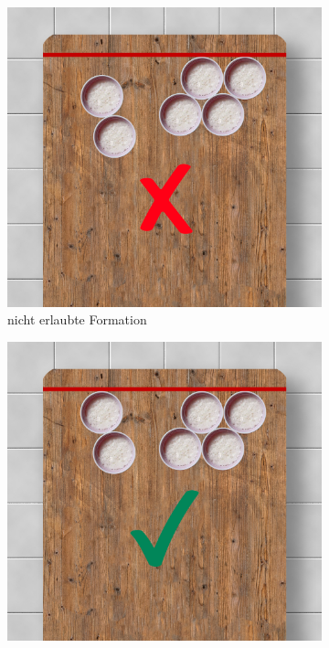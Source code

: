\documentclass[a5paper, 12pt]{book}
\begin{document}
\begin{enumerate}[(1)]
\begin{figure}[h!]
\begin{subfigure}[b]{0.434\textwidth}
     \end{subfigure}
     \hfill
     \begin{subfigure}[b]{0.434\textwidth}
         \centering
         \includegraphics[width=\textwidth]{no2}
         \caption{nicht erlaubte Formation}
     \end{subfigure}
     \hfill
     \begin{subfigure}[b]{0.434\textwidth}
         \centering
         \includegraphics[width=\textwidth]{yes1}

\end{subfigure}
\end{figure}
\end{enumerate}
\end{document}
